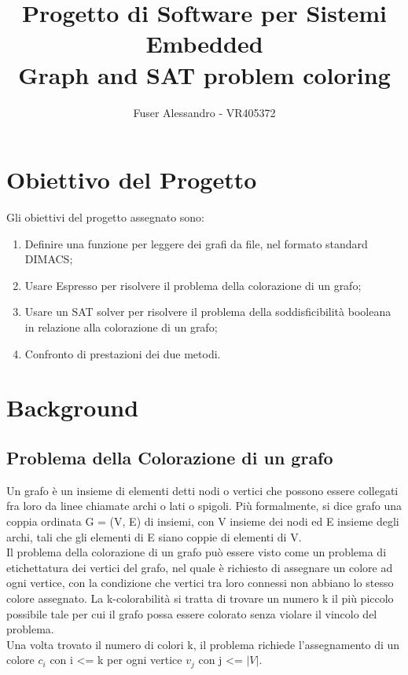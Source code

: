 \documentclass[a4paper,11pt]{article} %
\begin{document}
\author{Fuser Alessandro - VR405372}
\title{Progetto di Software per Sistemi Embedded \\ Graph and SAT problem coloring}
\maketitle

\tableofcontents

\newpage

\section{Obiettivo del Progetto}
Gli obiettivi del progetto assegnato sono:
\begin{enumerate}
	\item Definire una funzione per leggere dei grafi da file, nel formato standard DIMACS;
	\item Usare Espresso per risolvere il problema della colorazione di un grafo;
	\item Usare un SAT solver per risolvere il problema della soddisficibilità booleana in relazione alla colorazione di un grafo;
	\item Confronto di prestazioni dei due metodi.
\end{enumerate}

\section{Background}
\subsection{Problema della Colorazione di un grafo}
Un grafo è un insieme di elementi detti nodi o vertici che possono essere collegati fra loro da linee chiamate archi o lati o spigoli. Più formalmente, si dice grafo una coppia ordinata G = (V, E) di insiemi, con V insieme dei nodi ed E insieme degli archi, tali che gli elementi di E siano coppie di elementi di V. \\
Il problema della colorazione di un grafo può essere visto come un problema di etichettatura dei vertici del grafo, nel quale è richiesto di assegnare un colore ad ogni vertice, con la condizione che vertici tra loro connessi non abbiano lo stesso colore assegnato. La k-colorabilità si tratta di trovare un numero k il più piccolo possibile tale per cui il grafo possa essere colorato senza violare il vincolo del problema. \\
Una volta trovato il numero di colori k, il problema richiede l'assegnamento di un colore $c_{i}$ con i <= k per ogni vertice $v_{j}$ con j <= $|V|$.\\
\end{document}
